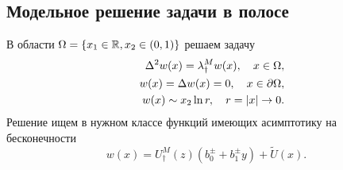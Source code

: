 \subsection{Модельное решение задачи в полосе}
В области $\Omega=\{x_1\in{\mathbb R}, x_2\in (0,1)\}$ решаем задачу
\begin{eqnarray}
\label{F1}
&&\Delta^2 w(x)=\lambda_\dagger^M w(x), \quad x\in \Omega,\\
\label{F2}
&&w(x)=\Delta w(x)=0, \quad x\in\partial\Omega,\\
\label{F3}
&&w(x)\sim x_2 \ln r, \quad r=|x|\to 0.
\end{eqnarray}
Решение ищем в нужном классе функций имеющих асимптотику на бесконечности
$$
w(x)=U_\dagger^M(z)(b_0^\pm+b_1^\pm y)+\widetilde{U}(x).
$$